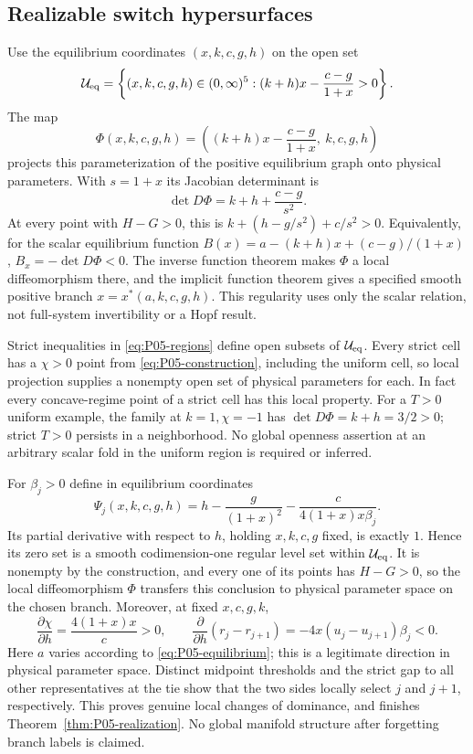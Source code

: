 \documentclass[11pt]{article}
\theoremstyle{definition}
\theoremstyle{remark}
\begin{document}
\subsection{Realizable switch hypersurfaces}

Use the equilibrium coordinates $(x,k,c,g,h)$ on the open set
\begin{equation}
 \mathcal U_{\rm eq}=
 \left\{(x,k,c,g,h)\in(0,\infty)^5:
     (k+h)x-\frac{c-g}{1+x}>0\right\}.
 \label{eq:P05-equilibrium-chart}
\end{equation}
The map
\[
 \Phi(x,k,c,g,h)=\left((k+h)x-\frac{c-g}{1+x},\ k,c,g,h\right)
\]
projects this parameterization of the positive equilibrium graph onto
physical parameters. With $s=1+x$ its Jacobian determinant is
\begin{equation}
 \det D\Phi=k+h+\frac{c-g}{s^2}.
 \label{eq:P05-chart-determinant}
\end{equation}
At every point with $H-G>0$, this is
$k+(h-g/s^2)+c/s^2>0$. Equivalently, for the scalar equilibrium
function $B(x)=a-(k+h)x+(c-g)/(1+x)$,
$B_x=-\det D\Phi<0$. The inverse function theorem makes $\Phi$ a
local diffeomorphism there, and the implicit function theorem gives a
specified smooth positive branch $x=x^*(a,k,c,g,h)$. This regularity
uses only the scalar relation, not full-system invertibility or a Hopf result.

Strict inequalities in \eqref{eq:P05-regions} define open subsets of
$\mathcal U_{\rm eq}$. Every strict cell has a $\chi>0$ point from
\eqref{eq:P05-construction}, including the uniform cell, so local
projection supplies a nonempty open set of physical parameters for each.
In fact every concave-regime point of a strict cell has this local property.
For a $T>0$ uniform example, the family at $k=1,\chi=-1$ has
$\det D\Phi=k+h=3/2>0$; strict $T>0$ persists in a neighborhood.
No global openness assertion at an arbitrary scalar fold in the uniform
region is required or inferred.

For $\beta_j>0$ define in equilibrium coordinates
\begin{equation}
 \Psi_j(x,k,c,g,h)=h-\frac{g}{(1+x)^2}
                  -\frac{c}{4(1+x)x\beta_j}.
 \label{eq:P05-level-set}
\end{equation}
Its partial derivative with respect to $h$, holding $x,k,c,g$ fixed,
is exactly $1$. Hence its zero set is a smooth codimension-one regular
level set within $\mathcal U_{\rm eq}$. It is nonempty by the construction,
and every one of its points has $H-G>0$, so the local diffeomorphism
$\Phi$ transfers this conclusion to physical parameter space on the
chosen branch. Moreover, at fixed $x,c,g,k$,
\[
 \frac{\partial\chi}{\partial h}=\frac{4(1+x)x}{c}>0,
 \qquad
 \frac{\partial}{\partial h}(r_j-r_{j+1})
       =-4x(u_j-u_{j+1})\beta_j<0.
\]
Here $a$ varies according to \eqref{eq:P05-equilibrium}; this is a
legitimate direction in physical parameter space. Distinct midpoint
thresholds and the strict gap to all other representatives at the tie
show that the two sides locally select $j$ and $j+1$, respectively.
This proves genuine local changes of dominance, and finishes
Theorem~\ref{thm:P05-realization}. No global manifold structure after
forgetting branch labels is claimed.
\end{document}
